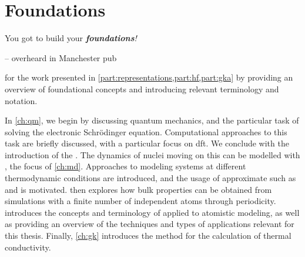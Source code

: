
\clearpage


\part{Foundations}

\label{part:foundation}

\thispagestyle{plain}
\begin{center}
  \begin{minipage}{0.8\textwidth}

    \vspace{4\baselineskip}

    You got to build your \textit{\textbf{foundations}!}

    \vspace{\baselineskip}
    {\hfill\raggedright -- overheard in Manchester pub\hspace{0.25cm}}
  \end{minipage}
\end{center}
\vspace{2\baselineskip}

 for the work presented in \cref{part:representations,part:hf,part:gka} by providing an overview of foundational concepts and introducing relevant terminology and notation.

In \cref{ch:qm}, we begin by discussing quantum mechanics, and the particular task of solving the electronic Schrödinger equation. Computational approaches to this task are briefly discussed, with a particular focus on \gls{dft}. We conclude with the introduction of the \bo \pes.
The dynamics of nuclei moving on this \pes can be modelled with \md, the focus of \cref{ch:md}. Approaches to modeling systems at different thermodynamic conditions are introduced, and the usage of approximate \pes such as \ffs and \mlps is motivated.
 then explores how bulk properties can be obtained from simulations with a finite number of independent atoms through periodicity.
 introduces the concepts and terminology of \ml applied to atomistic modeling, as well as providing an overview of the techniques and types of applications relevant for this thesis.
Finally, \cref{ch:gk} introduces the \gk method for the calculation of thermal conductivity.

